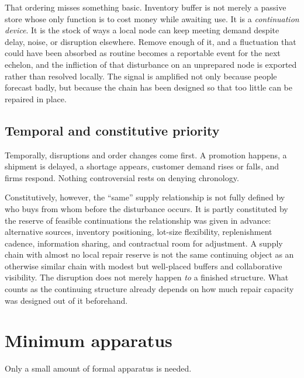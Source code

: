 \documentclass[11pt]{article}
\begin{document}
That ordering misses something basic. Inventory buffer is not merely a passive store whose only function is to cost money while awaiting use. It is a \emph{continuation device}. It is the stock of ways a local node can keep meeting demand despite delay, noise, or disruption elsewhere. Remove enough of it, and a fluctuation that could have been absorbed as routine becomes a reportable event for the next echelon, and the infliction of that disturbance on an unprepared node is exported rather than resolved locally. The signal is amplified not only because people forecast badly, but because the chain has been designed so that too little can be repaired in place.

\subsection*{Temporal and constitutive priority}
Temporally, disruptions and order changes come first. A promotion happens, a shipment is delayed, a shortage appears, customer demand rises or falls, and firms respond. Nothing controversial rests on denying chronology.

Constitutively, however, the ``same'' supply relationship is not fully defined by who buys from whom before the disturbance occurs. It is partly constituted by the reserve of feasible continuations the relationship was given in advance: alternative sources, inventory positioning, lot-size flexibility, replenishment cadence, information sharing, and contractual room for adjustment. A supply chain with almost no local repair reserve is not the same continuing object as an otherwise similar chain with modest but well-placed buffers and collaborative visibility. The disruption does not merely happen \emph{to} a finished structure. What counts as the continuing structure already depends on how much repair capacity was designed out of it beforehand.

\section{Minimum apparatus}
Only a small amount of formal apparatus is needed.
\end{document}
